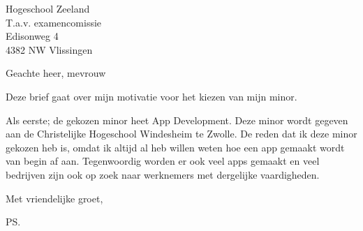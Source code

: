 \documentclass{letter}
\begin{document}
\begin{letter}{Hogeschool Zeeland \\ T.a.v. examencomissie \\ Edisonweg 4 \\ 4382 NW Vlissingen}

\opening{Geachte heer, mevrouw}

Deze brief gaat over mijn motivatie voor het kiezen van mijn minor.

Als eerste; de gekozen minor heet App Development. Deze minor wordt gegeven aan de Christelijke Hogeschool Windesheim te Zwolle. De reden dat ik deze minor gekozen heb is, omdat ik altijd al heb willen weten hoe een app gemaakt wordt van begin af aan. Tegenwoordig worden er ook veel apps gemaakt en veel bedrijven zijn ook op zoek naar werknemers met dergelijke vaardigheden. 


\closing{Met vriendelijke groet, }
\ps

\end{letter}
\end{document}
